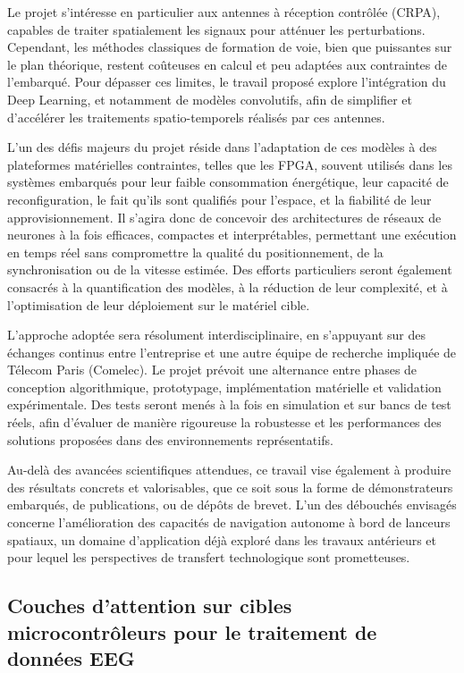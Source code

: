 \documentclass[11pt]{report}
\begin{document}
Le projet s'intéresse en particulier aux antennes à réception contrôlée (CRPA), capables de traiter spatialement les signaux pour atténuer les perturbations. Cependant, les méthodes classiques de formation de voie, bien que puissantes sur le plan théorique, restent coûteuses en calcul et peu adaptées aux contraintes de l'embarqué. Pour dépasser ces limites, le travail proposé explore l'intégration du Deep Learning, et notamment de modèles convolutifs, afin de simplifier et d'accélérer les traitements spatio-temporels réalisés par ces antennes.

L'un des défis majeurs du projet réside dans l'adaptation de ces modèles à des plateformes matérielles contraintes, telles que les FPGA, souvent utilisés dans les systèmes embarqués pour leur faible consommation énergétique, leur capacité de reconfiguration, le fait qu'ils sont qualifiés pour l'espace, et la fiabilité de leur approvisionnement. Il s'agira donc de concevoir des architectures de réseaux de neurones à la fois efficaces, compactes et interprétables, permettant une exécution en temps réel sans compromettre la qualité du positionnement, de la synchronisation ou de la vitesse estimée. Des efforts particuliers seront également consacrés à la quantification des modèles, à la réduction de leur complexité, et à l'optimisation de leur déploiement sur le matériel cible.

L'approche adoptée sera résolument interdisciplinaire, en s'appuyant sur des échanges continus entre l'entreprise et une autre équipe de recherche impliquée de Télecom Paris (Comelec). Le projet prévoit une alternance entre phases de conception algorithmique, prototypage, implémentation matérielle et validation expérimentale. Des tests seront menés à la fois en simulation et sur bancs de test réels, afin d'évaluer de manière rigoureuse la robustesse et les performances des solutions proposées dans des environnements représentatifs.

Au-delà des avancées scientifiques attendues, ce travail vise également à produire des résultats concrets et valorisables, que ce soit sous la forme de démonstrateurs embarqués, de publications, ou de dépôts de brevet. L'un des débouchés envisagés concerne l'amélioration des capacités de navigation autonome à bord de lanceurs spatiaux, un domaine d'application déjà exploré dans les travaux antérieurs et pour lequel les perspectives de transfert technologique sont prometteuses.

\subsection{Couches d'attention sur cibles microcontrôleurs pour le traitement de données EEG}
\end{document}
